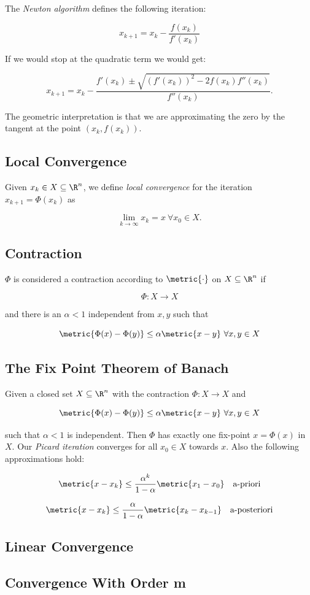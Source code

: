 The \emph{Newton algorithm} defines the following iteration:

\[
    x_{k + 1} =  x_k - \frac{f(x_k)}{f'(x_k)}
\]

If we would stop at the quadratic term we would get:

\[
    x_{k + 1} =  x_k - \frac{f'(x_k) \pm \sqrt{(f'(x_k))^2 - 2f(x_k)f''(x_k)}}{f''(x_k)}.
\]

The geometric interpretation is that we are approximating the zero by the tangent at the point 
\((x_k, f(x_k))\).

\subsection{Local Convergence}

Given \(x_k \in X \subseteq \R^n\), we define \emph{local convergence} for the iteration \(x_{k + 1} = \Phi(x_k)\) as 

\[
    \lim_{k \to \infty} x_k = x \ \forall x_0 \in X.
\]

\subsection{Contraction}

\(\Phi\) is considered a contraction according to \(\metric{\cdot}\) on \(X \subseteq \R^n\) if 

\[
    \Phi: X \to X
\]

and there is an \(\alpha < 1\) independent from \(x,y\) such that 

\[
    \metric{\Phi(x) - \Phi(y)} \le \alpha \metric{x - y} \ \forall x,y \in X
\]

\subsection{The Fix Point Theorem of Banach}

Given a closed set \(X \subseteq \R^n\) with the contraction \(\Phi : X \to X\) and 

\[
    \metric{\Phi(x) - \Phi(y)} \le \alpha \metric{x - y} \ \forall x,y \in X
\]

such that \(\alpha < 1\) is independent. Then \(\Phi\) has exactly one fix-point \(x = \Phi(x)\) in \(X\). Our
\emph{Picard iteration} converges for all \(x_0 \in X\) towards \(x\). Also the following approximations hold:

\[
    \metric{x - x_k} \le \frac{\alpha^k}{1 - \alpha} \metric{x_1 - x_0} \quad \text{a-priori}
\]

\[
    \metric{x - x_k} \le \frac{\alpha}{1 - \alpha} \metric{x_k - x_{k - 1}} \quad \text{a-posteriori}
\]

\subsection{Linear Convergence}

\subsection{Convergence With Order \texorpdfstring{m}{}}

